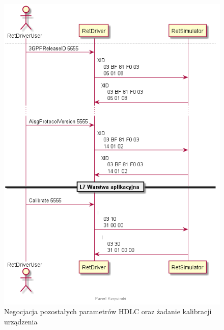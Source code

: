     \begin{figure}[h!]
    \centering
    \includegraphics[scale=0.75]{out/Diagramy/UML_DiagramOfSequence_New/KalibracjaRETa-page4.png}
    \caption{Negocjacja pozostałych parametrów HDLC oraz żadanie kalibracji urządzenia}
    \end{figure}

